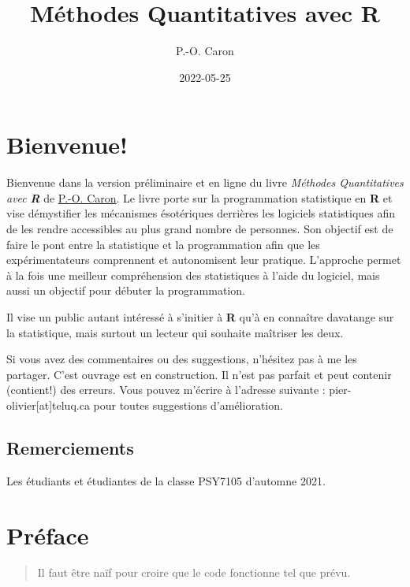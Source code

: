 \documentclass[
]{book}
\title{Méthodes Quantitatives avec R}
\author{P.-O. Caron}
\date{2022-05-25}
\begin{document}
\maketitle

{
\setcounter{tocdepth}{1}
\tableofcontents
}
\hypertarget{bienvenue}{%
\chapter*{Bienvenue!}\label{bienvenue}}

Bienvenue dans la version préliminaire et en ligne du livre \emph{Méthodes Quantitatives avec }\textbf{\emph{R}} de \href{https://www.teluq.ca/siteweb/univ/pcaron.html}{P.-O. Caron}. Le livre porte sur la programmation statistique en \textbf{R} et vise démystifier les mécanismes ésotériques derrières les logiciels statistiques afin de les rendre accessibles au plus grand nombre de personnes. Son objectif est de faire le pont entre la statistique et la programmation afin que les expérimentateurs comprennent et autonomisent leur pratique. L'approche permet à la fois une meilleur compréhension des statistiques à l'aide du logiciel, mais aussi un objectif pour débuter la programmation.

Il vise un public autant intéressé à s'initier à \textbf{R} qu'à en connaître davatange sur la statistique, mais surtout un lecteur qui souhaite maîtriser les deux.

Si vous avez des commentaires ou des suggestions, n'hésitez pas à me les partager. C'est ouvrage est en construction. Il n'est pas parfait et peut contenir (contient!) des erreurs. Vous pouvez m'écrire à l'adresse suivante : pier-olivier{[}at{]}teluq.ca pour toutes suggestions d'amélioration.

\hypertarget{remerciements}{%
\section*{Remerciements}\label{remerciements}}

Les étudiants et étudiantes de la classe PSY7105 d'automne 2021.

\hypertarget{pruxe9face}{%
\chapter*{Préface}\label{pruxe9face}}

\begin{quote}
Il faut être naïf pour croire que le code fonctionne tel que prévu.
\end{quote}
\end{document}
